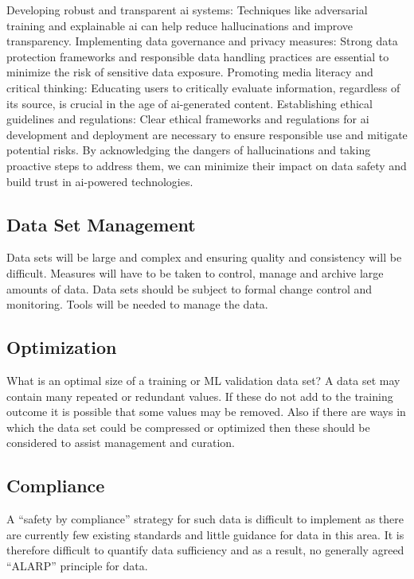\begin{aibox}
Developing robust and transparent \gls{ai} systems: Techniques like adversarial training and explainable \gls{ai} can help reduce hallucinations and improve transparency.
Implementing data governance and privacy measures: Strong data protection frameworks and responsible data handling practices are essential to minimize the risk of sensitive data exposure.
Promoting media literacy and critical thinking: Educating users to critically evaluate information, regardless of its source, is crucial in the age of \gls{ai}-generated content.
Establishing ethical guidelines and regulations: Clear ethical frameworks and regulations for \gls{ai} development and deployment are necessary to ensure responsible use and mitigate potential risks.
By acknowledging the dangers of hallucinations and taking proactive steps to address them, we can minimize their impact on data safety and build trust in \gls{ai}-powered technologies.
\end{aibox}

\subsection{Data Set Management}
Data sets will be large and complex and ensuring quality and consistency will be difficult. Measures will have to be taken to control, manage and archive large amounts of data. Data sets should be subject to formal change control and monitoring. Tools will be needed to manage the data.

\subsection{Optimization}
What is an optimal size of a training or
ML
validation data set? A data set may contain many repeated or redundant values. If these do not add to the training outcome it is possible that some values may be removed. Also if there are ways in which the data set could be compressed or optimized then these should be considered to assist management and curation.

\subsection{Compliance}
A ``safety by compliance'' strategy for such data is difficult to implement as there are currently
few existing standards and little guidance for data in this area.
It is therefore difficult to quantify data sufficiency and as a result, no generally agreed ``ALARP'' principle for data.

